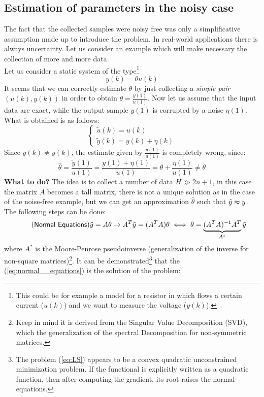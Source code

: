 \subsection{Estimation of parameters in the noisy case}
The fact that the collected samples were noisy free was only a simplificative assumption made up to introduce the problem. In real-world applications there is always uncertainty. Let us consider an example which will make necessary the collection of more and more data.\\
Let us consider a static system of the type\footnote{
    This could be for example a model for a resistor in which flows a certain current ($u(k)$) and we want to measure the voltage ($y(k)$).}
\begin{equation}
    y(k)=\theta{u(k)}
\end{equation}
It seems that we can correctly estimate $\theta$ by just collecting a \textit{simple pair} $(u(k),y(k))$ in order to obtain $\theta=\frac{y(1)}{u(1)}$. Now let us assume that the input data are exact, while the output sample $y(1)$ is corrupted by a noise $\eta(1)$. What is obtained is as follows:
\begin{equation*}
    \begin{cases}
        \tilde{u}(k)=u(k)\\
        \tilde{y}(k)=y(k)+\eta(k)
    \end{cases}
\end{equation*}
Since $\tilde{y(k)}\ne{y(k)}$, the estimate given by $\frac{y(1)}{u(1)}$ is completely wrong, since:
\begin{equation*}
    \hat{\theta}=\frac{\tilde{y}(1)}{u(1)}=\frac{y(1)+\eta(1)}{u(1)}=\theta+\frac{\eta(1)}{u(1)}\ne\theta
\end{equation*}
\textbf{What to do?} The idea is to collect a number of data $H\gg{2n+1}$, in this case the matrix $A$ becomes a tall matrix, there is not a unique solution as in the case of the noise-free example, but we can get an approximation $\hat{\theta}$ such that $\tilde{y}\thickapprox{y}$. The following steps can be done:
\begin{equation}\label{eq:normal__equations} \tag{\textsf{Normal Equations}}
    \tilde{y}={A}\theta \to A^T{\tilde{y}} = (A^T{A})\theta \iff \theta=\underbrace{(A^T{A})^{-1}A^T}_{A^*}{\tilde{y}}
\end{equation}
where $A^*$ is the Moore-Penrose pseudoinverse (generalization of the inverse for non-square matrices)\footnote{
    Keep in mind it is derived from the Singular Value Decomposition (SVD), which the generalization of the spectral Decomposition for non-symmetric matrices.
}. It can be demonstrated\footnote{
    The problem (\ref{eq:LS}) appears to be a convex quadratic unconstrained minimization problem. If the functional is explicitly written as a quadratic function, then after computing the gradient, its root raises the normal equations.
} that the (\ref{eq:normal__equations}) is the solution of the problem:
